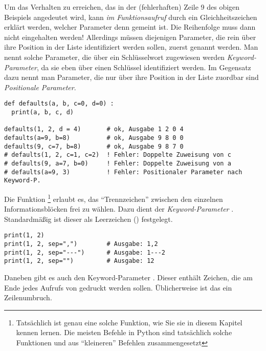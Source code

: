 Um das Verhalten zu erreichen, das in der (fehlerhaften) Zeile 9 des obigen Beispiels angedeutet wird, kann \emph{im Funktionsaufruf} durch ein Gleichheitszeichen erklärt werden, welcher Parameter denn gemeint ist. Die Reihenfolge muss dann nicht eingehalten werden! Allerdings müssen diejenigen Parameter, die rein über ihre Position in der Liste identifiziert werden sollen, zuerst genannt werden. Man nennt solche Parameter, die über ein Schlüsselwort zugewiesen werden \emph{Keyword-Parameter}, da sie eben über einen Schlüssel identifiziert werden. Im Gegensatz dazu nennt man Parameter, die nur über ihre Position in der Liste zuordbar sind \emph{Positionale Parameter}.

\begin{codebox}
\begin{verbatim}
def defaults(a, b, c=0, d=0) :
  print(a, b, c, d)
  
defaults(1, 2, d = 4)       # ok, Ausgabe 1 2 0 4
defaults(a=9, b=8)          # ok, Ausgabe 9 8 0 0
defaults(9, c=7, b=8)       # ok, Ausgabe 9 8 7 0
# defaults(1, 2, c=1, c=2)  ! Fehler: Doppelte Zuweisung von c
# defaults(9, a=7, b=0)     ! Fehler: Doppelte Zuweisung von a
# defaults(a=9, 3)          ! Fehler: Positionaler Parameter nach Keyword-P.
\end{verbatim}
\end{codebox}

Die Funktion \footnote{Tatsächlich ist  genau eine solche Funktion, wie Sie sie in diesem Kapitel kennen lernen. Die meisten Befehle in Python sind tatsächlich solche Funktionen und aus \enquote{kleineren} Befehlen zusammengesetzt} erlaubt es, das \enquote{Trennzeichen} zwischen den einzelnen Informationsblöcken frei zu wählen. Dazu dient der \emph{Keyword-Parameter} . Standardmäßig ist dieser als Leerzeichen () festgelegt.

\begin{codebox}
\begin{verbatim}
print(1, 2)
print(1, 2, sep=",")        # Ausgabe: 1,2
print(1, 2, sep="---")      # Ausgabe: 1---2
print(1, 2, sep="")         # Ausgabe: 12
\end{verbatim}
\end{codebox}

Daneben gibt es auch den Keyword-Parameter . Dieser enthält Zeichen, die am Ende jedes Aufrufs von  gedruckt werden sollen. Üblicherweise ist das ein Zeilenumbruch.

